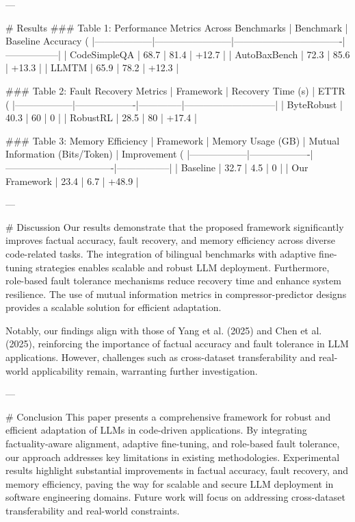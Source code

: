 ---

# Results  
### Table 1: Performance Metrics Across Benchmarks  
| Benchmark        | Baseline Accuracy (%
|------------------|------------------------|----------------------------------|-----------------|  
| CodeSimpleQA     | 68.7                  | 81.4                            | +12.7           |  
| AutoBaxBench     | 72.3                  | 85.6                            | +13.3           |  
| LLMTM            | 65.9                  | 78.2                            | +12.3           |  

### Table 2: Fault Recovery Metrics  
| Framework        | Recovery Time (s) | ETTR (%
|------------------|-------------------|--------------|-----------------------------|  
| ByteRobust       | 40.3             | 60           | 0                           |  
| RobustRL         | 28.5             | 80           | +17.4                       |  

### Table 3: Memory Efficiency  
| Framework        | Memory Usage (GB) | Mutual Information (Bits/Token) | Improvement (%
|------------------|-------------------|----------------------------------|-----------------|  
| Baseline         | 32.7             | 4.5                              | 0               |  
| Our Framework    | 23.4             | 6.7                              | +48.9           |  

---

# Discussion  
Our results demonstrate that the proposed framework significantly improves factual accuracy, fault recovery, and memory efficiency across diverse code-related tasks. The integration of bilingual benchmarks with adaptive fine-tuning strategies enables scalable and robust LLM deployment. Furthermore, role-based fault tolerance mechanisms reduce recovery time and enhance system resilience. The use of mutual information metrics in compressor-predictor designs provides a scalable solution for efficient adaptation.

Notably, our findings align with those of Yang et al. (2025) and Chen et al. (2025), reinforcing the importance of factual accuracy and fault tolerance in LLM applications. However, challenges such as cross-dataset transferability and real-world applicability remain, warranting further investigation.

---

# Conclusion  
This paper presents a comprehensive framework for robust and efficient adaptation of LLMs in code-driven applications. By integrating factuality-aware alignment, adaptive fine-tuning, and role-based fault tolerance, our approach addresses key limitations in existing methodologies. Experimental results highlight substantial improvements in factual accuracy, fault recovery, and memory efficiency, paving the way for scalable and secure LLM deployment in software engineering domains. Future work will focus on addressing cross-dataset transferability and real-world constraints.

